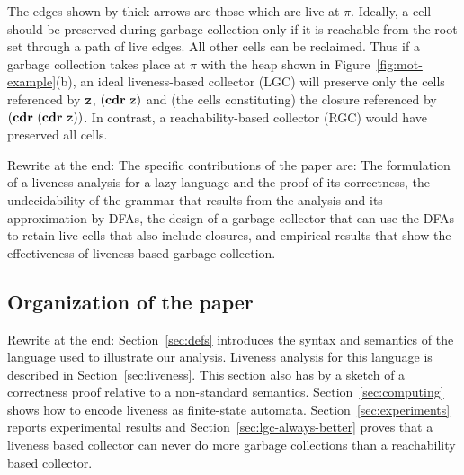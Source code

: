 \documentclass[9pt]{sigplanconf}
\begin{document}
The edges  shown by thick  arrows are those  which are live  at $\pi$.
Ideally, a cell should be  preserved during garbage collection only if
it is reachable from  the root set through a path  of live edges.  All
other  cells can  be reclaimed.   Thus if  a garbage  collection takes
place at $\pi$ with the heap shown in Figure~\ref{fig:mot-example}(b),
an ideal liveness-based  collector (LGC) will preserve  only the cells
referenced by  $\mbox{\tt z}$, $(\mbox{$\mathbf{cdr}$}~ \mbox{\tt z})$  and (the cells  constituting) the
closure   referenced   by   $(\mbox{$\mathbf{cdr}$}~(\mbox{$\mathbf{cdr}$}~\mbox{\tt z}))$.    In   contrast,   a
reachability-based collector (RGC) would have preserved all cells.

{\color {Myblue}Rewrite at the end: The specific contributions of the
paper
  are: The formulation of a  liveness analysis for a lazy language and
  the proof of its correctness, the undecidability of the grammar that
  results from the analysis and  its approximation by DFAs, the design
  of a  garbage collector that can  use the DFAs to  retain live cells
  that  also include  closures, and  empirical results  that  show the
  effectiveness of liveness-based garbage collection.}

\subsection{Organization of the paper}

{\color {Myblue}Rewrite at the end: 
Section~\ref{sec:defs} introduces the syntax and semantics of the
language used to illustrate our
analysis.
Liveness analysis for this language is  described in
Section~\ref{sec:liveness}. This section also has by  a  sketch  of  a
correctness proof  relative  to  a  non-standard
semantics.  Section~\ref{sec:computing}  shows how to  encode liveness
as   finite-state  automata.    Section~\ref{sec:experiments}  reports
experimental  results  and Section~\ref{sec:lgc-always-better}  proves
that a liveness based collector  can never do more garbage collections
than a reachability based collector.
}
\end{document}
